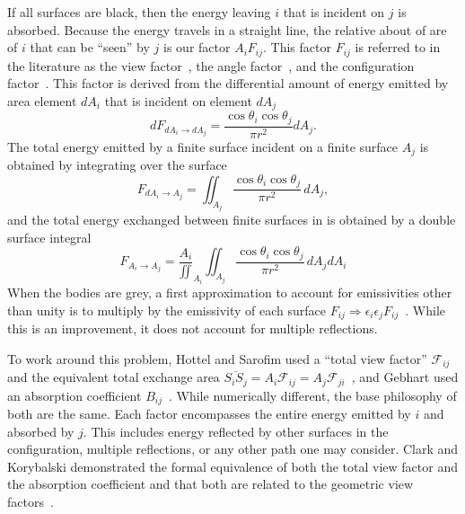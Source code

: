 If all surfaces are black, then the energy leaving \(i\) that is
incident on \(j\) is absorbed.  Because the energy travels in a straight
line, the relative about of are of \(i\) that can be ``seen'' by \(j\)
is our factor \(A_iF_{ij}\).  This factor \(F_{ij}\) is referred to in
the literature as the view factor~\cite{clark_algebraic_1974,
hottel_radiative_1967}, the angle factor~\cite{hottel_radiative_1967,
sparrow_new_1963}, and the configuration
factor~\cite{eichberger_calculation_1985}.  This factor is derived from
the differential amount of energy emitted by area element \(dA_i\) that
is incident on element \(dA_j\)~\cite{sparrow_new_1963}
\begin{equation}
    dF_{dA_i\to dA_j} = \frac{\cos\theta_i\cos\theta_j}{\pi r^2} dA_j.
\end{equation}
The total energy emitted by a finite surface incident on a finite
surface \(A_j\) is obtained by integrating over the surface
\begin{equation}
    F_{dA_i\to A_j} = \iint_{A_j} \frac{\cos\theta_i\cos\theta_j}{\pi
    r^2} \, dA_j,
\end{equation}
and the total energy exchanged between finite surfaces in is obtained by
a double surface integral~\cite{sparrow_new_1963}
\begin{equation}
    F_{A_i\to A_j} = \frac{A_i}\iint_{A_i}\iint_{A_j} 
    \frac{\cos\theta_i\cos\theta_j}{\pi r^2} \, dA_j dA_i
\end{equation}
When the bodies are grey, a
first approximation to account for emissivities other than unity is to
multiply by the emissivity of each surface
\(F_{ij}\Rightarrow\epsilon_i\epsilon_j
F_{ij}\)~\cite{eichberger_calculation_1985}.  While this is an
improvement, it does not account for multiple reflections.

To work around this problem, Hottel and Sarofim used a ``total view
factor'' \(\mathcal{F}_{ij}\) and the equivalent total exchange area
\(\overline{S_iS_j} = A_i\mathcal{F}_{ij} =
A_j\mathcal{F}_{ji}\)~\cite{hottel_radiative_1967}, and Gebhart used an
absorption coefficient \(B_{ij}\)~\cite{gebhart_surface_1961}.  While
numerically different, the base philosophy of both are the same.  Each
factor encompasses the entire energy emitted by \(i\) and absorbed by
\(j\).  This includes energy reflected by other surfaces in the
configuration, multiple reflections, or any other path one may consider.
Clark and Korybalski demonstrated the formal equivalence of both the
total view factor and the absorption coefficient and that both are
related to the geometric view factors~\cite{clark_algebraic_1974}.

